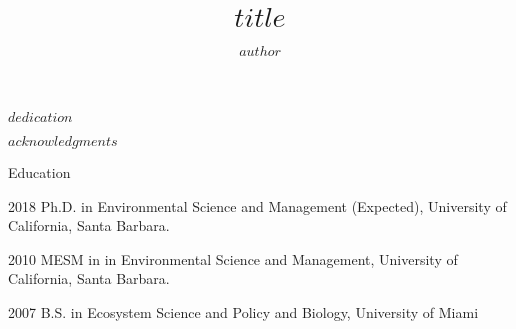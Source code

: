 \documentclass[twoside,12pt,final]{ucthesis-CA2012}
\begin{document}
\begin{ucfrontmatter}


  \title{$title$}

  \author{$author$}

     


	\maketitle
	\approvalpage
	\copyrightpage


    \begin{dedication}

      \vspace*{25ex}

      \begin{center}
      \begin{Large}

        $dedication$

      \end{Large}

      \end{center}

  \end{dedication}
  \begin{acknowledgements}
    $acknowledgments$
  \end{acknowledgements}
  \begin{vitae}

    \begin{vitaesection}{Education}
    \vspace{-0.1cm}
    \item [2018]	Ph.D. in Environmental Science and Management (Expected), University of California, Santa Barbara.
    \item [2010]	MESM in in Environmental Science and Management, University of California, Santa Barbara.
    \item [2007]	B.S. in Ecosystem Science and Policy and Biology, University of Miami
    \end{vitaesection}


\end{vitae}
\end{ucfrontmatter}
\end{document}
